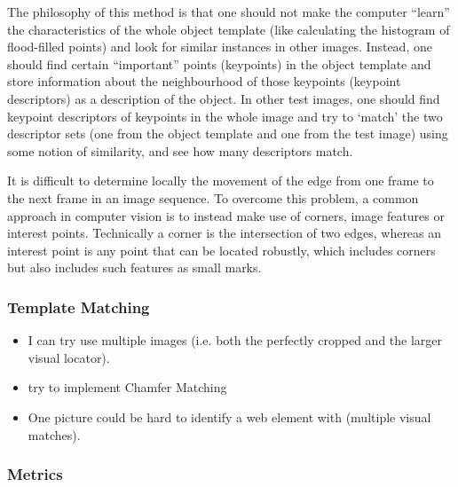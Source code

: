 The philosophy of this method is that one should not make the computer ``learn'' the characteristics of the whole object template (like calculating the histogram of flood-filled points) and look for similar instances in other images. Instead, one should find certain ``important'' points (keypoints) in the object template and store information about the neighbourhood of those keypoints (keypoint descriptors) as a description of the object. In other test images, one should find keypoint descriptors of keypoints in the whole image and try to `match' the two descriptor sets (one from the object template and one from the test image) using some notion of similarity, and see how many descriptors match.

It is difficult to determine locally the movement of the edge from one frame to the next frame in an image sequence. 
To overcome this problem, a common approach in computer vision is to instead make use of corners, image features or interest points.
Technically a corner is the intersection of two edges, whereas an interest point is any point that can be located robustly, which includes corners but also includes such features as small marks.

\subsubsection{Template Matching}

\begin{itemize}
\item I can try use multiple images (i.e. both the perfectly cropped and the larger visual locator).
\item try to implement Chamfer Matching
\item One picture could be hard to identify a web element with (multiple visual matches). 
\end{itemize}

\subsubsection{Metrics}

